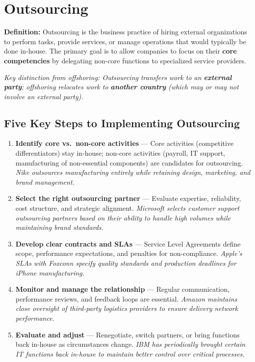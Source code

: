 \documentclass[11pt, letterpaper]{article}
\begin{document}
\newpage

\section{Outsourcing}

\begin{defbox}
\textbf{Definition:} Outsourcing is the business practice of hiring external organizations to perform tasks, provide services, or manage operations that would typically be done in-house. The primary goal is to allow companies to focus on their \textbf{core competencies} by delegating non-core functions to specialized service providers.
\end{defbox}

\textit{Key distinction from offshoring: Outsourcing transfers work to an \textbf{external party}; offshoring relocates work to \textbf{another country} (which may or may not involve an external party).}

\subsection{Five Key Steps to Implementing Outsourcing}

\begin{enumerate}[leftmargin=*, label=\textbf{Step \arabic*.}]
  \item \textbf{Identify core vs.\ non-core activities} --- Core activities (competitive differentiators) stay in-house; non-core activities (payroll, IT support, manufacturing of non-essential components) are candidates for outsourcing. \textit{Nike outsources manufacturing entirely while retaining design, marketing, and brand management.}
  \item \textbf{Select the right outsourcing partner} --- Evaluate expertise, reliability, cost structure, and strategic alignment. \textit{Microsoft selects customer support outsourcing partners based on their ability to handle high volumes while maintaining brand standards.}
  \item \textbf{Develop clear contracts and SLAs} --- Service Level Agreements define scope, performance expectations, and penalties for non-compliance. \textit{Apple's SLAs with Foxconn specify quality standards and production deadlines for iPhone manufacturing.}
  \item \textbf{Monitor and manage the relationship} --- Regular communication, performance reviews, and feedback loops are essential. \textit{Amazon maintains close oversight of third-party logistics providers to ensure delivery network performance.}
  \item \textbf{Evaluate and adjust} --- Renegotiate, switch partners, or bring functions back in-house as circumstances change. \textit{IBM has periodically brought certain IT functions back in-house to maintain better control over critical processes.}
\end{enumerate}
\end{document}
